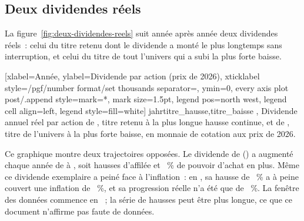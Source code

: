 \subsection{Deux dividendes r\'eels}\label{sec:porte-exemples}

La figure~\ref{fig:deux-dividendes-reels} suit ann\'ee apr\`es ann\'ee deux dividendes r\'eels~: celui
du titre retenu dont le dividende a mont\'e le plus longtemps sans interruption, et celui du titre de
tout l'univers qui a subi la plus forte baisse.


[xlabel={Ann\'ee}, ylabel={Dividende par action (prix de 2026)},
  xticklabel style={/pgf/number format/set thousands separator={}}, ymin=0,
  every axis plot post/.append style={mark=*, mark size=1.5pt},
  legend pos=north west, legend cell align=left, legend style={fill=white}]%
  {jahr}{titre_hausse,titre_baisse}%
  {{\BeispielHausseTicker},{\BeispielBaisse}}%
  {Dividende annuel r\'eel par action de \BeispielHausseTicker{}, titre retenu \`a la plus longue
  hausse continue, et de \BeispielBaisse, titre de l'univers \`a la plus forte baisse, en monnaie de
  cotation aux prix de 2026.\label{fig:deux-dividendes-reels}}

Ce graphique montre deux trajectoires oppos\'ees. Le dividende de \BeispielHausse{}
(\BeispielHausseTicker) a augment\'e chaque ann\'ee de \BeispielHausseDebut{} \`a \BeispielHausseFin,
soit \BeispielHausseHausses{} hausses d'affil\'ee et \BeispielHausseReelTotal~\% de pouvoir d'achat en
plus. M\^eme ce dividende exemplaire a pein\'e face \`a l'inflation~: en \BeispielHausseReelMinAnnee,
sa hausse de \BeispielHausseNominalMinAnnee~\% a \`a peine couvert une inflation de
\BeispielHausseInflationMinAnnee~\%, et sa progression r\'eelle n'a \'et\'e que de
\BeispielHausseReelMin~\%. La fen\^etre des donn\'ees commence en \DonneesDebut~; la s\'erie de hausses
peut \^etre plus longue, ce que ce document n'affirme pas faute de donn\'ees.

